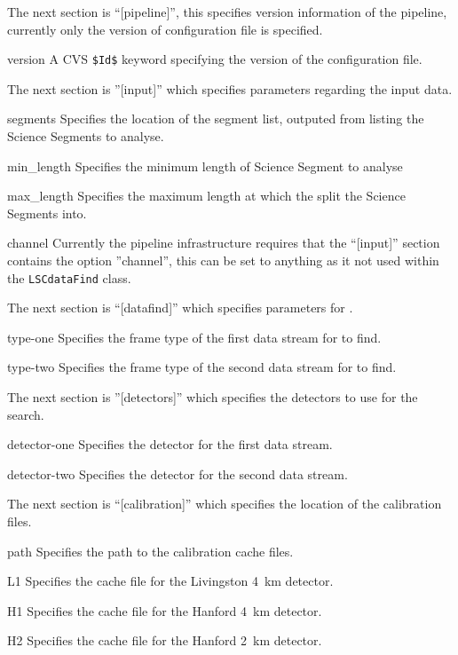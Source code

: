 \begin{entry}
The next section is ``[pipeline]'', this specifies version information
of the pipeline, currently only the version of configuration file is
specified.
\begin{entry}
\item[version]
A CVS \texttt{\$Id\$} keyword specifying the version of the
configuration file.
\end{entry}

The next section is ''[input]'' which specifies parameters regarding
the input data.
\begin{entry}
\item[segments]
Specifies the location of the segment list, outputed from
 listing the Science Segments to analyse.
\item[min\_length]
Specifies the minimum length of Science Segment to analyse
\item[max\_length]
Specifies the maximum length at which the split the Science Segments
into.
\item[channel]
Currently the pipeline infrastructure requires that the ``[input]''
section contains the option ''channel'', this can be set to anything as
it not used within the \texttt{LSCdataFind} class.
\end{entry}

The next section is ``[datafind]'' which specifies parameters for
.
\begin{entry}
\item[type-one]
Specifies the frame type of the first data stream for 
to find.
\item[type-two]
Specifies the frame type of the second data stream for
 to find.
\end{entry}

The next section is ''[detectors]'' which specifies the detectors to use
for the search.
\begin{entry}
\item[detector-one]
Specifies the detector for the first data stream.
\item[detector-two]
Specifies the detector for the second data stream.
\end{entry}

The next section is ``[calibration]'' which specifies the location of
the calibration files.
\begin{entry}
\item[path]
Specifies the path to the calibration cache files.
\item[L1]
Specifies the cache file for the Livingston 4~km detector.
\item[H1]
Specifies the cache file for the Hanford 4~km detector.
\item[H2]
Specifies the cache file for the Hanford 2~km detector.
\end{entry}


\end{entry}
